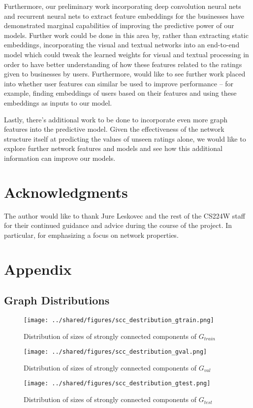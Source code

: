\documentclass[letterpaper, 10 pt, conference]{ieeeconf}  %
\begin{document}
Furthermore, our preliminary work incorporating deep convolution neural nets and recurrent neural nets to extract feature embeddings for the businesses have demonstrated marginal capabilities of improving the predictive power of our models. Further work could be done in this area by, rather than extracting static embeddings, incorporating the visual and textual networks into an end-to-end model which could tweak the learned weights for visual and textual processing in order to have better understanding of how these features related to the ratings given to businesses by users. Furthermore, would like to see further work placed into whether user features can similar be used to improve performance -- for example, finding embeddings of users based on their features and using these embeddings as inputs to our model.

Lastly, there's additional work to be done to incorporate even more graph features into the predictive model. Given the effectiveness of the network structure itself at predicting the values of unseen ratings alone, we would like to explore further network features and models and see how this additional information can improve our models.


\section{Acknowledgments}
The author would like to thank Jure Leskovec and the rest of the CS224W staff for their continued guidance and advice during the course of the project. In particular, for emphasizing a focus on network properties.

{}


\section{Appendix}

\subsection{Graph Distributions}
\label{sec:graph_distributions}
\begin{figure}[h!]
\centering
\texttt{[image: ../shared/figures/scc\_destribution\_gtrain.png]}
\caption{Distribution of sizes of strongly connected components of $G_{train}$}
\label{fig:distribution_scc_g_train}
\end{figure}
\begin{figure}[h!]
\centering
\texttt{[image: ../shared/figures/scc\_destribution\_gval.png]}
\caption{Distribution of sizes of strongly connected components of $G_{val}$}
\label{fig:distribution_scc_g_val}
\end{figure}
\begin{figure}[h!]
\centering
\texttt{[image: ../shared/figures/scc\_destribution\_gtest.png]}
\caption{Distribution of sizes of strongly connected components of $G_{test}$}
\label{fig:distribution_scc_g_test}
\end{figure}
\end{document}
